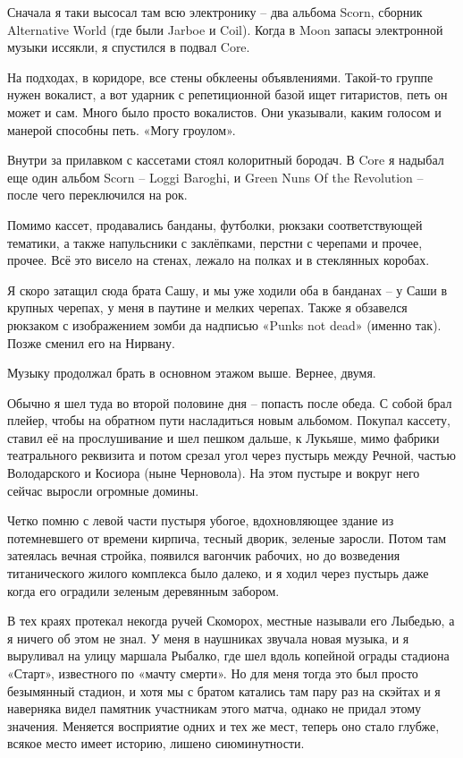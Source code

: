 Сначала я таки высосал там всю электронику – два альбома Scorn, сборник Alternative World (где были Jarboe и Coil). Когда в Moon запасы электронной музыки иссякли, я спустился в подвал Core.

На подходах, в коридоре, все стены обклеены объявлениями. Такой-то группе нужен вокалист, а вот ударник с репетиционной базой ищет гитаристов, петь он может и сам. Много было просто вокалистов. Они указывали, каким голосом и манерой способны петь. «Могу гроулом».

Внутри за прилавком с кассетами стоял колоритный бородач. В Core я надыбал еще один альбом Scorn – Loggi Baroghi, и Green Nuns Of the Revolution – после чего переключился на рок.

Помимо кассет, продавались банданы, футболки, рюкзаки соответствующей тематики, а также напульсники с заклёпками, перстни с черепами и прочее, прочее. Всё это висело на стенах, лежало на полках и в стеклянных коробах.

Я скоро затащил сюда брата Сашу, и мы уже ходили оба в банданах – у Саши в крупных черепах, у меня в паутине и мелких черепах. Также я обзавелся рюкзаком с изображением зомби да надписью «Punks not dead» (именно так). Позже сменил его на Нирвану.

Музыку продолжал брать в основном этажом выше. Вернее, двумя.

Обычно я шел туда во второй половине дня – попасть после обеда. С собой брал плейер, чтобы на обратном пути насладиться новым альбомом. Покупал  кассету, ставил её на прослушивание и шел пешком дальше, к Лукьяше, мимо фабрики театрального реквизита и потом срезал угол через пустырь между Речной, частью Володарского и Косиора (ныне Черновола). На этом пустыре и вокруг него сейчас выросли огромные домины.

Четко помню с левой части пустыря убогое, вдохновляющее здание из потемневшего от времени кирпича, тесный дворик, зеленые заросли. Потом там затеялась вечная стройка, появился вагончик рабочих, но до возведения титанического жилого комплекса было далеко, и я ходил через пустырь даже когда его оградили зеленым деревянным забором.

В тех краях протекал некогда ручей Скоморох, местные называли его Лыбедью, а я ничего об этом не знал. У меня в наушниках звучала новая музыка, и я выруливал на улицу маршала Рыбалко, где шел вдоль копейной ограды стадиона «Старт», известного по «мачту смерти». Но для меня тогда это был просто безымянный стадион, и хотя мы с братом катались там пару раз на скэйтах и я наверняка видел памятник участникам этого матча, однако не придал этому значения. Меняется восприятие одних и тех же мест, теперь оно стало глубже, всякое место имеет историю, лишено сиюминутности.


